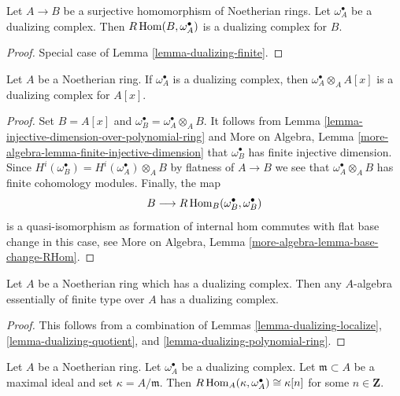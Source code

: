 \begin{lemma}
\label{lemma-dualizing-quotient}
Let $A \to B$ be a surjective homomorphism of Noetherian rings.
Let $\omega_A^\bullet$ be a dualizing complex.
Then $R\mathop{\mathrm{Hom}}\nolimits(B, \omega_A^\bullet)$ is a dualizing complex for $B$.
\end{lemma}

\begin{proof}
Special case of Lemma \ref{lemma-dualizing-finite}.
\end{proof}

\begin{lemma}
\label{lemma-dualizing-polynomial-ring}
Let $A$ be a Noetherian ring. If $\omega_A^\bullet$ is a dualizing
complex, then $\omega_A^\bullet \otimes_A A[x]$ is a dualizing
complex for $A[x]$.
\end{lemma}

\begin{proof}
Set $B = A[x]$ and $\omega_B^\bullet = \omega_A^\bullet \otimes_A B$.
It follows from Lemma \ref{lemma-injective-dimension-over-polynomial-ring}
and More on Algebra, Lemma \ref{more-algebra-lemma-finite-injective-dimension}
that $\omega_B^\bullet$ has finite injective dimension.
Since $H^i(\omega_B^\bullet) = H^i(\omega_A^\bullet) \otimes_A B$
by flatness of $A \to B$ we see that $\omega_A^\bullet \otimes_A B$
has finite cohomology modules. Finally, the map
$$
B \longrightarrow R\mathop{\mathrm{Hom}}\nolimits_B(\omega_B^\bullet, \omega_B^\bullet)
$$
is a quasi-isomorphism as formation of internal hom commutes with
flat base change in this case, see
More on Algebra, Lemma \ref{more-algebra-lemma-base-change-RHom}.
\end{proof}

\begin{proposition}
\label{proposition-dualizing-essentially-finite-type}
Let $A$ be a Noetherian ring which has a dualizing complex.
Then any $A$-algebra essentially of finite type over $A$
has a dualizing complex.
\end{proposition}

\begin{proof}
This follows from a combination of
Lemmas \ref{lemma-dualizing-localize},
\ref{lemma-dualizing-quotient}, and \ref{lemma-dualizing-polynomial-ring}.
\end{proof}

\begin{lemma}
\label{lemma-find-function}
Let $A$ be a Noetherian ring. Let $\omega_A^\bullet$ be a dualizing
complex. Let $\mathfrak m \subset A$ be a maximal ideal and set
$\kappa = A/\mathfrak m$. Then
$R\mathop{\mathrm{Hom}}\nolimits_A(\kappa, \omega_A^\bullet) \cong \kappa[n]$ for some
$n \in \mathbf{Z}$.
\end{lemma}

